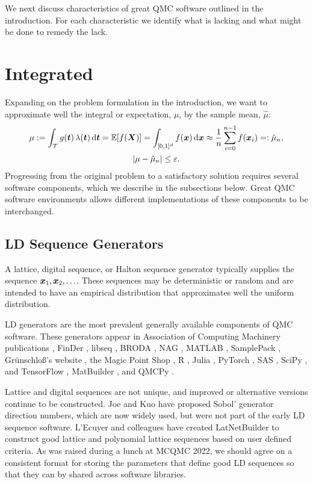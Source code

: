 \documentclass[graybox]{svmult}
\begin{document}
We next discuss characteristics of great QMC software outlined in the introduction.  For each characteristic we identify what is lacking and what might be done to remedy the lack.

\section{Integrated} \label{CDHS_sec:integrated}

Expanding on the problem formulation in the introduction, we want to approximate well the integral or expectation, $\mu$, by the sample mean, $\hat{\mu}$:
\begin{gather}
\label{eq:cubSummary}
	\mu : = \int_\calT g(\bst) \, \lambda(\bst) \, \D \bst  = \bbE[f(\bsX)] = \int_{[0,1]^d} f(\bsx)  \, \D \bsx \approx \frac 1n \sum_{i=0}^{n-1} f(\bsx_i) =: \hat{\mu}_n, \\
 \label{CDHS_eq:error_tol}
 \abs{\mu - \hat{\mu}_n} \le \varepsilon.
\end{gather}
Progressing from the original problem to a satisfactory solution requires several software components, which we describe in the subsections below.  Great QMC software environments allows different implementations of these components to be interchanged.  

\subsection{LD Sequence Generators} A lattice, digital sequence, or Halton sequence generator typically supplies the sequence ${\boldsymbol{x}}_1, {\boldsymbol{x}}_2, \ldots$.  These sequences may be deterministic or random and are intended to have an empirical distribution that approximates well the uniform distribution.

LD generators are the most prevalent generally available components of QMC software.  These generators appear in Association of Computing Machinery  publications \cite{BraFox88,BraFoxNie92,HonHic00a}, FinDer \cite{PasTra95,FinDer}, libseq \cite{FriKel02,FriKelweb}, BRODA \cite{BRODA20a}, NAG \cite{NAG27}, MATLAB \cite{MAT9.13}, SamplePack \cite{SamplePack}, Gr\"unschlo{\ss}'s website \cite{GruWeb}, the Magic Point Shop \cite{NuyWeb}, R \cite{QRNG2020}, Julia \cite{QMCJulia}, PyTorch \cite{paszke2019pytorch}, SAS \cite{SAS_LD}, SciPy \cite{virtanen2020scipy}, and TensorFlow \cite{tfqfQMC2021a}, MatBuilder \cite{paulin2022}, and  QMCPy \cite{QMCPy2020a}.

Lattice and digital sequences are not unique, and improved or alternative versions continue to be constructed.  Joe and Kuo \cite{JoeKuo03,JoeKuo08,SobolDirection} have proposed  Sobol' generator direction numbers, which are now widely used, but were not part of the early LD sequence software.  L'Ecuyer and colleagues have created LatNetBuilder \cite{LatNet} to construct good lattice and polynomial lattice sequences based on user defined criteria. As was raised during a lunch at MCQMC 2022, we should agree on a consistent format for storing the parameters that define good LD sequences so that they can by shared across software libraries.
\end{document}

